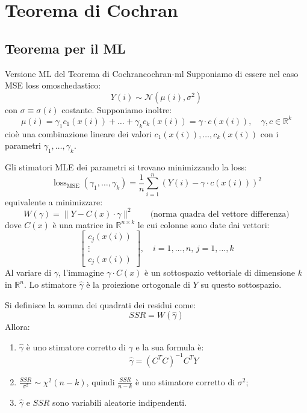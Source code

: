 \section{Teorema di Cochran}

\subsection{Teorema per il ML}
\begin{teorema}{Versione ML del Teorema di Cochran}{cochran-ml}
Supponiamo di essere nel caso MSE loss omoschedastico:
\[
Y(i) \sim \mathcal{N}(\mu(i), \sigma^2)
\]
con $\sigma \equiv \sigma(i)$ costante. Supponiamo inoltre:
\[
    \mu(i) = \gamma_1 c_1(x(i)) + \dots + \gamma_k c_k(x(i)) = \gamma \cdot c(x(i)), \quad \gamma,c \in \mathbb{R}^k
\]
cioè una combinazione lineare dei valori $c_1(x(i)), \ldots, c_k(x(i))$ con i parametri $\gamma_1, \ldots,
\gamma_k$.

Gli stimatori MLE dei parametri si trovano minimizzando la loss:
\[
\operatorname{loss}_{\text{MSE}}(\gamma_1, \dots, \gamma_k) = \frac{1}{n} \sum_{i=1}^n (Y(i) - \gamma \cdot c(x(i)))^2
\]
equivalente a minimizzare:
\[
    W(\gamma) = \| Y - C(x) \cdot \gamma \|^2 \qquad \text{(norma quadra del vettore
    differenza)}
\]
dove $C(x)$ è una matrice in $\mathbb{R}^{n \times k}$ le cui colonne sono date dai vettori:
\[
\begin{bmatrix}
c_j(x(i)) \\
\vdots \\
c_j(x(i))
\end{bmatrix}, \quad i = 1, \dots, n,\, j = 1, \dots, k
\]
Al variare di $\gamma$, l'immagine $\gamma \cdot C(x)$ è un sottospazio vettoriale di dimensione $k$ in $\mathbb{R}^n$. Lo stimatore $\hat{\gamma}$ è la proiezione ortogonale di $Y$ su questo sottospazio.

Si definisce la somma dei quadrati dei residui come:
\[
    SSR = W(\hat{\gamma})
\]
Allora:
\begin{enumerate}
    \item $\hat{\gamma}$ è uno stimatore corretto di $\gamma$ e la sua formula è:
        \begin{equation*}\label{eq:cochran-gamma-estimator}
            \hat{\gamma} = (C^T C)^{-1} C^T Y
        \end{equation*}
    \item \( \frac{SSR}{\sigma^2} \sim \chi^2(n-k) \), quindi \( \frac{SSR}{n-k} \) è uno stimatore corretto di $\sigma^2$;
  \item $\hat{\gamma}$ e $SSR$ sono variabili aleatorie indipendenti.
\end{enumerate}
\end{teorema}

